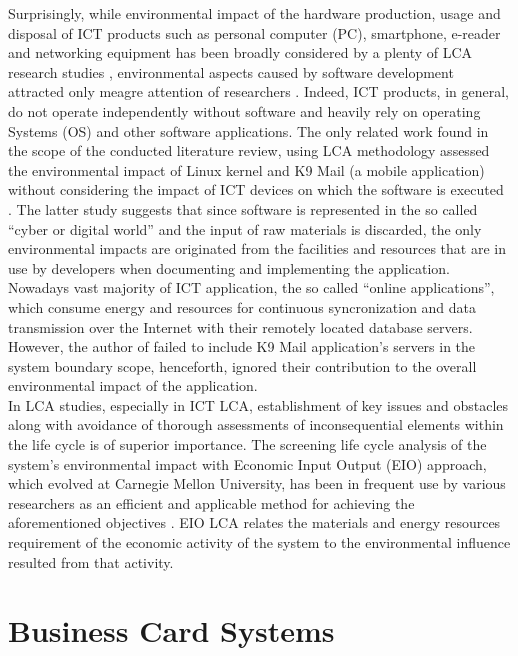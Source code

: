 \documentclass[3p,times,procedia]{elsarticle}
\begin{document}
Surprisingly, while environmental impact of the hardware production, usage and disposal of ICT products such as personal computer (PC), smartphone, e-reader and networking equipment has been broadly considered by a plenty of LCA research studies \cite{guldbrandsson2012opportunities, Bull201410, farrant2012environmental, enroth2009,koljonen2008environmental}, environmental aspects caused by software development attracted only meagre attention of researchers \cite{Moshnyaga:2013}. Indeed, ICT products, in general, do not operate independently without software and heavily rely on operating Systems (OS) and other software applications. The only related work found in the scope of the conducted literature review, using LCA methodology assessed the environmental impact of Linux kernel and K9 Mail (a mobile application) without considering the impact of ICT devices on which the software is executed \cite{moshnyaga2013assessment,Moshnyaga:2013}. The latter study suggests that since software is represented in the so called ``cyber or digital world'' and the input of raw materials is discarded, the only environmental impacts are originated from the facilities and resources that are in use by developers when documenting and implementing the application. Nowadays vast majority of ICT application, the so called ``online applications'', which consume energy and resources for continuous syncronization and data transmission over the Internet with their remotely located database servers. However, the author of \cite{Moshnyaga:2013} failed to include K9 Mail application's servers in the system boundary scope, henceforth, ignored their contribution to the overall environmental impact of the application.\\

In LCA studies, especially in ICT LCA, establishment of key issues and obstacles along with avoidance of thorough assessments of inconsequential elements within the life cycle is of superior importance. The screening life cycle analysis of the system's environmental impact with Economic Input Output (EIO) approach, which evolved at Carnegie Mellon University, has been in frequent use by various researchers as an efficient and applicable method for achieving the aforementioned objectives \cite{1208069, junnila2008life, matthews2000extending}. EIO LCA relates the materials and energy resources requirement of the economic activity of the system to the environmental influence resulted from that activity.

\section{Business Card Systems}
\end{document}
